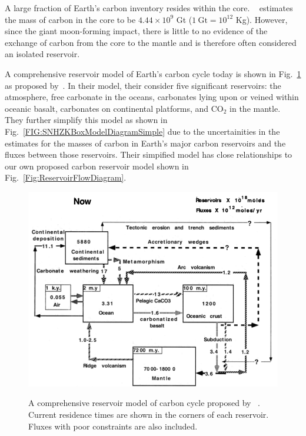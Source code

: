A large fraction of Earth's carbon inventory resides within the core. ~\cite{DR-CH-SN:2013} estimates the mass of carbon in the core to be $4.44 \times 10^9$ Gt ($1~\text{Gt} = 10^{12}$ Kg). However, since the giant moon-forming impact, there is little to no evidence of the exchange of carbon from the core to the mantle and is therefore often considered an isolated reservoir. 

A comprehensive reservoir model of Earth's carbon cycle today is shown in Fig.~\ref{FIG:ModelSNH} as proposed by~\citet{SNH-ZK:2001}. In their model, their consider five significant reservoirs: the atmosphere, free carbonate in the oceans, carbonates lying upon or veined within oceanic basalt, carbonates on continental platforms, and $\mathrm{CO}_2$ in the mantle. They further simplify this model as shown in Fig.~\ref{FIG:SNHZKBoxModelDiagramSimple} due to the uncertainities in the estimates for the masses of carbon in Earth's major carbon reservoirs and the fluxes between those reservoirs. Their simpified model has close relationships to our own proposed carbon reservoir model shown in Fig.~\ref{Fig:ReservoirFlowDiagram}.


\begin{figure}[h!]
  \centering
  \includegraphics[scale=0.5]{Figures/ModelSNH.png}
  \label{FIG:ModelSNH}
  \caption{A comprehensive reservoir model of carbon cycle proposed by ~\citet{SNH-ZK:2001}. Current residence times are shown in the corners of each reservoir. Fluxes with poor constraints are also included.}
\end{figure}

